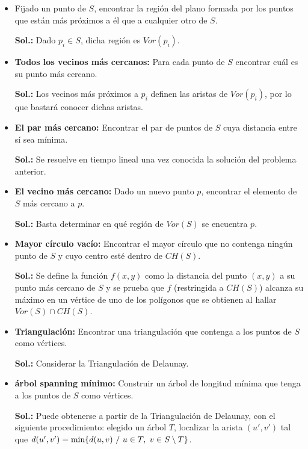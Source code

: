 \documentclass[twoside]{report}
\begin{document}
\begin{itemize}

  \item Fijado un punto de $S$, encontrar la región del plano formada por los puntos que están más próximos a él que a cualquier otro de $S$.

  \item[\textbf{Sol.:}] Dado $p_i \in S$, dicha región es $Vor(p_i)$.


  \item \textbf{Todos los vecinos más cercanos:} Para cada punto de $S$ encontrar cuál es su punto más cercano.

  \item[\textbf{Sol.:}] Los vecinos más próximos a $p_i$ definen las aristas de $Vor(p_i)$, por lo que bastará conocer dichas aristas.


  \item \textbf{El par más cercano:} Encontrar el par de puntos de $S$ cuya distancia entre sí sea mínima.

  \item[\textbf{Sol.:}] Se resuelve en tiempo lineal una vez conocida la solución del
problema anterior.


  \item \textbf{El vecino más cercano:} Dado un nuevo punto $p$,
encontrar el elemento de $S$ más cercano a $p$.

  \item[\textbf{Sol.:}] Basta determinar en qué región de $Vor(S)$ se encuentra $p$.


  \item \textbf{Mayor círculo vacío:} Encontrar el mayor círculo que no contenga ningún punto de $S$ y cuyo centro esté dentro de $CH(S)$.

  \item[\textbf{Sol.:}] Se define la función $f(x,y)$ como la distancia del punto $(x,y)$ a su punto más cercano de $S$ y se prueba que $f$ (restringida a $CH(S)$) alcanza su máximo en un vértice de uno de los polígonos que se obtienen al hallar $Vor(S)\cap CH(S)$.


  \item \textbf{Triangulación:} Encontrar una triangulación que contenga a los puntos de $S$ como vértices.

  \item[\textbf{Sol.:}] Considerar la Triangulación de Delaunay.


  \item \textbf{árbol spanning mínimo:} Construir un árbol de longitud mínima que tenga a los puntos de $S$ como vértices.

  \item[\textbf{Sol.:}] Puede obtenerse a partir de la Triangulación de Delaunay, con el siguiente procedimiento: elegido un árbol $T$, localizar la arista $(u',v')$ tal que $d(u',v')={\rm min}\{d(u,v) \ / \ u\in T, \ v\in S\setminus T\}$.

\end{itemize}
\end{document}
